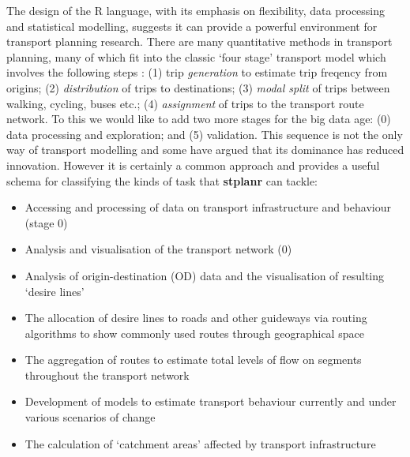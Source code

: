 The design of the R language, with its emphasis on flexibility, data
processing and statistical modelling, suggests it can provide a powerful
environment for transport planning research. There are many quantitative
methods in transport planning, many of which fit into the
classic `four stage' transport model which involves the following steps
\citep{willumsen_modelling_2011}:
(1) trip \emph{generation} to estimate trip freqency from origins;
(2) \emph{distribution} of trips to destinations;
(3) \emph{modal split} of trips between walking, cycling, buses etc.;
(4) \emph{assignment} of trips to the transport route network.
To this we would like to add two more stages for the big data age:
(0) data processing and exploration; and
(5) validation.
This sequence is not the only way of transport modelling
and some have argued that its dominance has reduced innovation.
However it is certainly a common approach and provides a useful
schema for classifying the kinds of task that \textbf{stplanr} can tackle:

\begin{itemize}
\tightlist
\item
  Accessing and processing of data on transport infrastructure and
  behaviour (stage 0)
\item
  Analysis and visualisation of the transport network (0)
\item
  Analysis of origin-destination (OD) data and the visualisation of
  resulting `desire lines'
\item
  The allocation of desire lines to roads and other guideways via
  routing algorithms to show commonly used routes through geographical
  space
\item
  The aggregation of routes to estimate total levels of flow on segments
  throughout the transport network
\item
  Development of models to estimate transport behaviour currently and
  under various scenarios of change
\item
  The calculation of `catchment areas' affected by transport
  infrastructure
\end{itemize}

